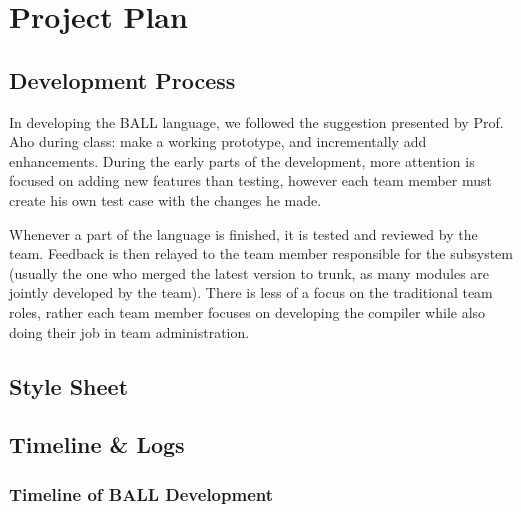 \chapter{Project Plan}

\section{Development Process}\label{Process}

In developing the BALL language, we followed the suggestion presented
by Prof. Aho during class: make a working prototype, and incrementally
add enhancements. During the early parts of the development, more
attention is focused on adding new features than testing, however each
team member must create his own test case with the changes he made.

Whenever a part of the language is finished, it is tested and reviewed
by the team. Feedback is then relayed to the team member responsible
for the subsystem (usually the one who merged the latest version to
trunk, as many modules are jointly developed by the team). There is
less of a focus on the traditional team roles, rather each team member
focuses on developing the compiler while also doing their job in team
administration.

\pagebreak
\section{Style Sheet}\label{Style}


\pagebreak

\section{Timeline \& Logs}\label{TimelineLogs}
\subsection{Timeline of BALL Development}

